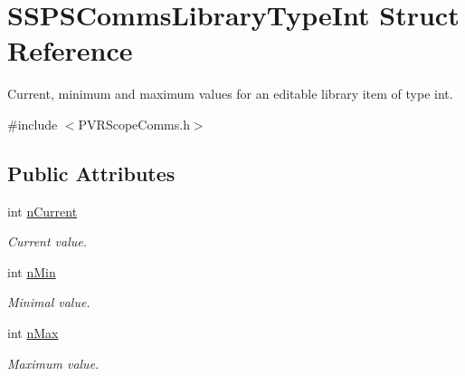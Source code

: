 \hypertarget{struct_s_s_p_s_comms_library_type_int}{\section{S\+S\+P\+S\+Comms\+Library\+Type\+Int Struct Reference}
\label{struct_s_s_p_s_comms_library_type_int}
}


Current, minimum and maximum values for an editable library item of type int.  




{\ttfamily \#include $<$P\+V\+R\+Scope\+Comms.\+h$>$}

\subsection*{Public Attributes}
\begin{DoxyCompactItemize}
\item 
\hypertarget{struct_s_s_p_s_comms_library_type_int_aae119d8701c1171bb85bcf0490a4dc44}{int \hyperlink{struct_s_s_p_s_comms_library_type_int_aae119d8701c1171bb85bcf0490a4dc44}{n\+Current}}\label{struct_s_s_p_s_comms_library_type_int_aae119d8701c1171bb85bcf0490a4dc44}

\begin{DoxyCompactList}\small\item\em Current value. \end{DoxyCompactList}\item 
\hypertarget{struct_s_s_p_s_comms_library_type_int_a2fef58a7dcb1e39f207025d86b06a77b}{int \hyperlink{struct_s_s_p_s_comms_library_type_int_a2fef58a7dcb1e39f207025d86b06a77b}{n\+Min}}\label{struct_s_s_p_s_comms_library_type_int_a2fef58a7dcb1e39f207025d86b06a77b}

\begin{DoxyCompactList}\small\item\em Minimal value. \end{DoxyCompactList}\item 
\hypertarget{struct_s_s_p_s_comms_library_type_int_ab2d5574ec039e5a87ee8898fe8e83180}{int \hyperlink{struct_s_s_p_s_comms_library_type_int_ab2d5574ec039e5a87ee8898fe8e83180}{n\+Max}}\label{struct_s_s_p_s_comms_library_type_int_ab2d5574ec039e5a87ee8898fe8e83180}

\begin{DoxyCompactList}\small\item\em Maximum value. \end{DoxyCompactList}\end{DoxyCompactItemize}


